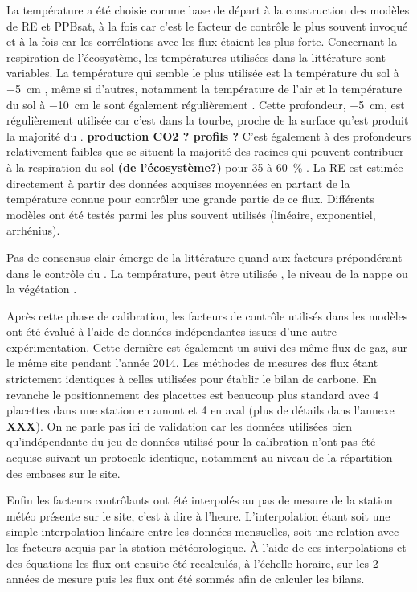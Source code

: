 La température a été choisie comme base de départ à la construction des modèles de RE et PPBsat, à la fois car c'est le facteur de contrôle le plus souvent invoqué et à la fois car les corrélations avec les flux étaient les plus forte.
Concernant la respiration de l'écosystème, les températures utilisées dans la littérature sont variables.
La température qui semble le plus utilisée est la température du sol à \SI{-5}{\centi\metre}  \cite{ballantyne2014}\plop, même si d'autres, notamment la température de l'air et la température du sol à \SI{-10}{\centi\metre} le sont également régulièrement \cite{bortoluzzi2006,kim1992}.
Cette profondeur, \SI{-5}{\cm}, est régulièrement utilisée car c'est dans la tourbe, proche de la surface qu'est produit la majorité du \coo.
\textbf{production CO2 ? profils ?}
C'est également à des profondeurs relativement faibles que se situent la majorité des racines \plop qui peuvent contribuer à la respiration du sol \textbf{(de l'écosystème?)} pour 35 à \SI{60}{\percent} \cite{silvola1996,crow2005}.
La RE est estimée directement à partir des données acquises moyennées en partant de la température connue pour contrôler une grande partie de ce flux.
Différents modèles ont été testés parmi les plus souvent utilisés (linéaire, exponentiel, arrhénius).

Pas de consensus clair émerge de la littérature quand aux facteurs prépondérant dans le contrôle du \chh.
La température, peut être utilisée \cite{alm1999,bubier1995}, le niveau de la nappe \cite{bubier1993} ou la végétation \cite{bortoluzzi2006}.

Après cette phase de calibration, les facteurs de contrôle utilisés dans les modèles ont été évalué à l'aide de données indépendantes issues d'une autre expérimentation.
Cette dernière est également un suivi des même flux de gaz, sur le même site pendant l'année 2014.
Les méthodes de mesures des flux étant strictement identiques à celles utilisées pour établir le bilan de carbone.
En revanche le positionnement des placettes est beaucoup plus standard avec 4 placettes dans une station en amont et 4 en aval (plus de détails dans l'annexe \textbf{XXX}).
On ne parle pas ici de validation car les données utilisées bien qu'indépendante du jeu de données utilisé pour la calibration n'ont pas été acquise suivant un protocole identique, notamment au niveau de la répartition des embases sur le site.

Enfin les facteurs contrôlants ont été interpolés au pas de mesure de la station météo présente sur le site, c'est à dire à l'heure.
L'interpolation étant soit une simple interpolation linéaire entre les données mensuelles, soit une relation avec les facteurs acquis par la station météorologique.
À l'aide de ces interpolations et des équations les flux ont ensuite été recalculés, à l'échelle horaire, sur les 2 années de mesure puis les flux ont été sommés afin de calculer les bilans.


